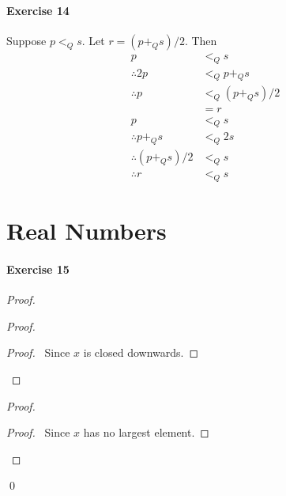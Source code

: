 \documentclass{report}
\begin{document}
    \paragraph{Exercise 14}
    Suppose $p <_Q s$. Let $r = (p +_Q s) / 2$. Then
    \begin{align*}
        p & <_Q s \\
        \therefore 2p & <_Q p +_Q s \\
        \therefore p & <_Q (p +_Q s) / 2 \\
        & = r \\
        p & <_Q s \\
        \therefore p +_Q s & <_Q 2s \\
        \therefore (p +_Q s)/2 & <_Q s \\
        \therefore r & <_Q s
    \end{align*}

    \section{Real Numbers}

    \paragraph{Exercise 15}
    \begin{proof}
        \pf
        \begin{proof}
            \begin{proof}
                \pf\ Since $x$ is closed downwards.
            \end{proof}
        \end{proof}
        \begin{proof}
            \begin{proof}
                \pf\ Since $x$ has no largest element.
            \end{proof}
        \end{proof}
        \qed
    \end{proof}
    
\end{document}
